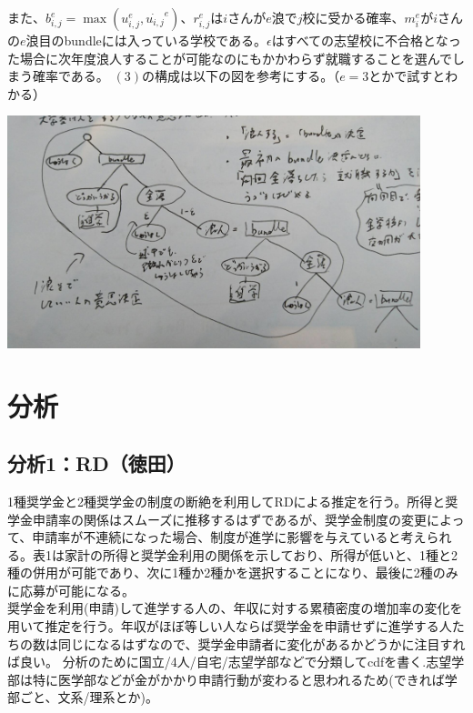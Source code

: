 \documentclass{jsarticle}
\begin{document}
	また、$b_{i, j}^e = \max(u_{i, j}^e, \dot{u_{i, j}}^e)$、$r_{i, j}^e$は$i$さんが$e$浪で$j$校に受かる確率、$m_i^e$が$i$さんの$e$浪目のbundleには入っている学校である。$\epsilon$はすべての志望校に不合格となった場合に次年度浪人することが可能なのにもかかわらず就職することを選んでしまう確率である。
	$(3)$の構成は以下の図を参考にする。（$e = 3$とかで試すとわかる）
	\begin{center}
	\includegraphics[width = 12cm]{fig1.png}
	\end{center}
	
	\section{分析}
	\subsection{分析1：RD（徳田）}
	1種奨学金と2種奨学金の制度の断絶を利用してRDによる推定を行う。所得と奨学金申請率の関係はスムーズに推移するはずであるが、奨学金制度の変更によって、申請率が不連続になった場合、制度が進学に影響を与えていると考えられる。表1は家計の所得と奨学金利用の関係を示しており、所得が低いと、1種と2種の併用が可能であり、次に1種か2種かを選択することになり、最後に2種のみに応募が可能になる。\\

 奨学金を利用(申請)して進学する人の、年収に対する累積密度の増加率の変化を用いて推定を行う。年収がほぼ等しい人ならば奨学金を申請せずに進学する人たちの数は同じになるはずなので、奨学金申請者に変化があるかどうかに注目すれば良い。
 分析のために国立/4人/自宅/志望学部などで分類してcdfを書く.志望学部は特に医学部などが金がかかり申請行動が変わると思われるため(できれば学部ごと、文系/理系とか)。\\
\end{document}
